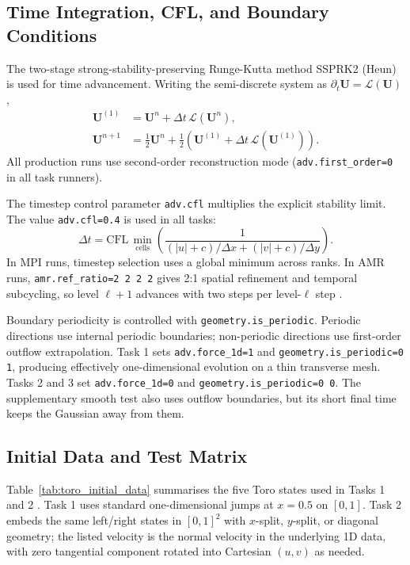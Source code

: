 \documentclass[final,3p,times,twocolumn]{elsarticle}
\begin{document}
\subsection{Time Integration, CFL, and Boundary Conditions}

The two-stage strong-stability-preserving Runge-Kutta method SSPRK2 (Heun) \cite{gottlieb2001} is used for time advancement. Writing the semi-discrete system as $\partial_t\mathbf{U}=\mathcal{L}(\mathbf{U})$,
\begin{equation}
\begin{aligned}
\mathbf{U}^{(1)} &= \mathbf{U}^n+\Delta t\,\mathcal{L}(\mathbf{U}^n),\\
\mathbf{U}^{n+1} &= \tfrac{1}{2}\mathbf{U}^n+\tfrac{1}{2}\left(\mathbf{U}^{(1)}+\Delta t\,\mathcal{L}(\mathbf{U}^{(1)})\right).
\end{aligned}
\end{equation}
All production runs use second-order reconstruction mode (\texttt{adv.first\_order=0} in all task runners).

The timestep control parameter \texttt{adv.cfl} multiplies the explicit stability limit. The value \texttt{adv.cfl=0.4} is used in all tasks:
\begin{equation}
\Delta t = \mathrm{CFL}\,\min_{\mathrm{cells}}\left(\frac{1}{(|u|+c)/\Delta x + (|v|+c)/\Delta y}\right).
\end{equation}
In MPI runs, timestep selection uses a global minimum across ranks. In AMR runs, \texttt{amr.ref\_ratio=2 2 2 2} gives 2:1 spatial refinement and temporal subcycling, so level $\ell+1$ advances with two steps per level-$\ell$ step \cite{amrexdocs}.

Boundary periodicity is controlled with \texttt{geometry.is\_periodic}. Periodic directions use internal periodic boundaries; non-periodic directions use first-order outflow extrapolation. Task 1 sets \texttt{adv.force\_1d=1} and \texttt{geometry.is\_periodic=0 1}, producing effectively one-dimensional evolution on a thin transverse mesh. Tasks 2 and 3 set \texttt{adv.force\_1d=0} and \texttt{geometry.is\_periodic=0 0}. The supplementary smooth test also uses outflow boundaries, but its short final time keeps the Gaussian away from them.

\subsection{Initial Data and Test Matrix}

Table~\ref{tab:toro_initial_data} summarises the five Toro states used in Tasks 1 and 2 \cite{toro2009}. Task 1 uses standard one-dimensional jumps at $x=0.5$ on $[0,1]$. Task 2 embeds the same left/right states in $[0,1]^2$ with $x$-split, $y$-split, or diagonal geometry; the listed velocity is the normal velocity in the underlying 1D data, with zero tangential component rotated into Cartesian $(u,v)$ as needed.
\end{document}
